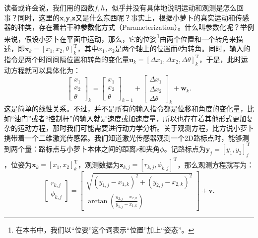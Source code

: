 读者或许会说，我们用的函数$f,h$，似乎并没有具体地说明运动和观测是怎么回事？同时，这里的$\bm{x}$,$\bm{y}$,$\bm{z}$又是什么东西呢？事实上，根据小萝卜的真实运动和传感器的种类，存在着若干种\textbf{参数化}方式（Parameterization）。什么叫参数化呢？举例来说，假设小萝卜在平面中运动，那么，它的位姿\footnote{在本书中，我们以“位姿”这个词表示“位置”加上“姿态”。}由两个位置和一个转角来描述，即$\bm{x}_k = [x_1,x_2,\theta]_k^\mathrm{T}$，其中$x_1,x_2$是两个轴上的位置而$\theta$为转角。同时，输入的指令是两个时间间隔位置和转角的变化量$\bm{u}_k = [ \Delta x_1, \Delta x_2, \Delta \theta ]_k^\mathrm{T} $，于是，此时运动方程就可以具体化为：
\begin{equation}
{\left[ \begin{array}{l}
	x_1\\
	x_2\\
	\theta
	\end{array} \right]_k} = {\left[ \begin{array}{l}
	x_1\\
	x_2\\
	\theta
	\end{array} \right]_{k - 1}} + {\left[ \begin{array}{l}
	\Delta x_1\\
	\Delta x_2\\
	\Delta \theta
	\end{array} \right]_k} + {\bm{w}_k}.
\end{equation}
这是简单的线性关系。不过，并不是所有的输入指令都是位移和角度的变化量，比如“油门”或者“控制杆”的输入就是速度或加速度量，所以也存在着其他形式更加复杂的运动方程，那时我们可能需要进行动力学分析。关于观测方程，比方说小萝卜携带着一个二维激光传感器。我们知道激光传感器观测一个2D路标点时，能够测到两个量：路标点与小萝卜本体之间的距离$r$和夹角$\phi$。记路标点为$\bm{y}_j = [y_1, y_2]_j^\mathrm{T}$，位姿为$\bm{x}_k=[x_1,x_2]_k^\mathrm{T}$，观测数据为$\bm{z}_{k,j} = [r_{k,j}, \phi_{k,j}]^\mathrm{T}$，那么观测方程就写为：
\begin{equation}
\left[ \begin{array}{l}
r_{k,j}\\
\phi_{k,j}
\end{array} \right] = \left[ \begin{array}{l}
\sqrt {{{\left(y_{1,j} - x_{1,k} \right)}^2} + {{\left( {{y_{2,j}} - x_{2,k}} \right)}^2}} \\
\arctan \left( \frac{{y_{2,j}} - x_{2,k}}{{y_{1,j} - x_{1,k}}} \right)
\end{array} \right] + \bm{v}.
\end{equation}

